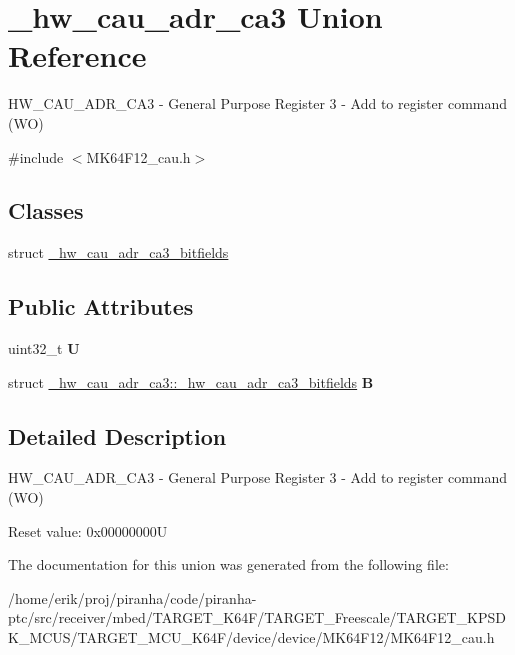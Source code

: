 \hypertarget{union__hw__cau__adr__ca3}{}\section{\+\_\+hw\+\_\+cau\+\_\+adr\+\_\+ca3 Union Reference}
\label{union__hw__cau__adr__ca3}


H\+W\+\_\+\+C\+A\+U\+\_\+\+A\+D\+R\+\_\+\+C\+A3 -\/ General Purpose Register 3 -\/ Add to register command (WO)  




{\ttfamily \#include $<$M\+K64\+F12\+\_\+cau.\+h$>$}

\subsection*{Classes}
\begin{DoxyCompactItemize}
\item 
struct \hyperlink{struct__hw__cau__adr__ca3_1_1__hw__cau__adr__ca3__bitfields}{\+\_\+hw\+\_\+cau\+\_\+adr\+\_\+ca3\+\_\+bitfields}
\end{DoxyCompactItemize}
\subsection*{Public Attributes}
\begin{DoxyCompactItemize}
\item 
uint32\+\_\+t {\bfseries U}\hypertarget{union__hw__cau__adr__ca3_a84e8eac4051ec7da42acbeeb210ff6df}{}\label{union__hw__cau__adr__ca3_a84e8eac4051ec7da42acbeeb210ff6df}

\item 
struct \hyperlink{struct__hw__cau__adr__ca3_1_1__hw__cau__adr__ca3__bitfields}{\+\_\+hw\+\_\+cau\+\_\+adr\+\_\+ca3\+::\+\_\+hw\+\_\+cau\+\_\+adr\+\_\+ca3\+\_\+bitfields} {\bfseries B}\hypertarget{union__hw__cau__adr__ca3_a5dcd52f8549813a0406af59f490549fe}{}\label{union__hw__cau__adr__ca3_a5dcd52f8549813a0406af59f490549fe}

\end{DoxyCompactItemize}


\subsection{Detailed Description}
H\+W\+\_\+\+C\+A\+U\+\_\+\+A\+D\+R\+\_\+\+C\+A3 -\/ General Purpose Register 3 -\/ Add to register command (WO) 

Reset value\+: 0x00000000U 

The documentation for this union was generated from the following file\+:\begin{DoxyCompactItemize}
\item 
/home/erik/proj/piranha/code/piranha-\/ptc/src/receiver/mbed/\+T\+A\+R\+G\+E\+T\+\_\+\+K64\+F/\+T\+A\+R\+G\+E\+T\+\_\+\+Freescale/\+T\+A\+R\+G\+E\+T\+\_\+\+K\+P\+S\+D\+K\+\_\+\+M\+C\+U\+S/\+T\+A\+R\+G\+E\+T\+\_\+\+M\+C\+U\+\_\+\+K64\+F/device/device/\+M\+K64\+F12/M\+K64\+F12\+\_\+cau.\+h\end{DoxyCompactItemize}
